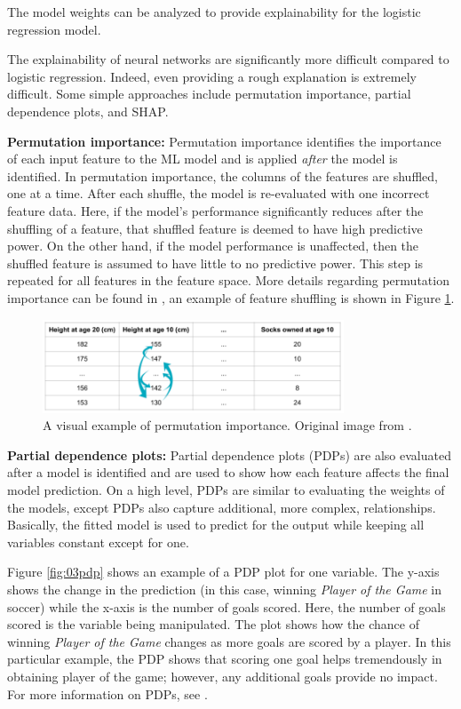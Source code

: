 The model weights can be analyzed to provide explainability for the logistic regression model.

The explainability of neural networks are significantly more difficult compared to logistic regression.  Indeed, even providing a rough explanation is extremely difficult. Some simple approaches include permutation importance, partial dependence plots, and SHAP.  

\textbf{Permutation importance:} Permutation importance identifies the importance of each input feature to the ML model and is applied \textit{after} the model is identified.  In permutation importance, the columns of the features are shuffled, one at a time.  After each shuffle, the model is re-evaluated with  one incorrect feature data.  Here, if the model's performance significantly reduces after the shuffling of a feature, that shuffled feature is deemed to have high predictive power.  On the other hand, if the model performance is unaffected, then the shuffled feature is assumed to have little to no predictive power. This step is repeated for all features in the feature space. More details regarding permutation importance can be found in \cite{perm_imp}, an example of feature shuffling is shown in Figure \ref{fig:03perm_imp}.
\begin{figure}[H]
    \centering
    \includegraphics[width=0.8\textwidth]{images/ch3/perm_imp.jpeg}
    \caption{A visual example of permutation importance. Original image from \cite{img_perm_imp}.}
    \label{fig:03perm_imp}
\end{figure}


\textbf{Partial dependence plots:} Partial dependence plots (PDPs) are also evaluated after a model is identified and are used to show how each feature affects the final model prediction.  On a high level, PDPs are similar to evaluating the weights of the models, except PDPs also capture additional, more complex, relationships.  Basically, the fitted model is used to predict for the output while keeping all variables constant except for one.  

Figure \ref{fig:03pdp} shows an example of a PDP plot for one variable.  The y-axis shows the change in the prediction (in this case, winning \textit{Player of the Game} in soccer) while the x-axis is the number of goals scored. Here, the number of goals scored is the variable being manipulated. The plot shows how the chance of winning \textit{Player of the Game} changes as more goals are scored by a player.  In this particular example, the PDP shows that scoring one goal helps tremendously in obtaining player of the game; however, any additional goals provide no impact. For more information on PDPs, see \cite{pdp}.

